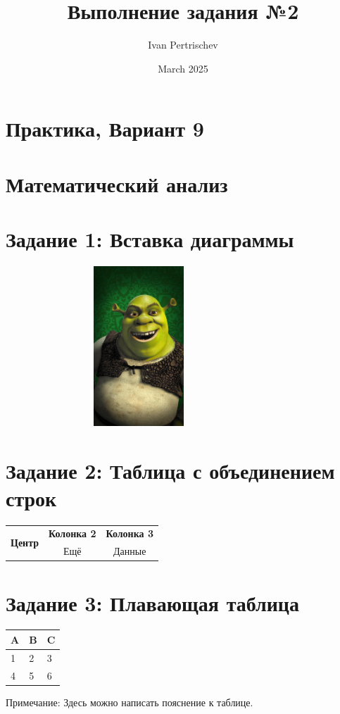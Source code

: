 \documentclass[a4paper, 11pt]{article}
\title{Выполнение задания №2}
\author{Ivan Pertrischev}
\date{March 2025}
\begin{document}
\maketitle

\section{Практика, Вариант 9}
\section{Математический анализ}

\section*{Задание 1: Вставка диаграммы}
\begin{center}
    \includegraphics[width=10cm,height=6cm,trim=0cm 2cm 0cm 0cm,clip,angle=12]{chart.jpg}
\end{center}

\section*{Задание 2: Таблица с объединением строк}
\begin{table}[h]
    \centering
    \begin{tabular}{ccc}
        \hline
        \multirow{2}{*}{\textbf{Центр}} & \textbf{Колонка 2} & \textbf{Колонка 3} \\
        \cline{2-3}
        & Ещё & Данные \\
        \hline
    \end{tabular}
\end{table}

\section*{Задание 3: Плавающая таблица}
\begin{table}[b]
    \centering
    \begin{tabularx}{0.7\textwidth}{XXX} 
        \toprule
        A & B & C \\
        \midrule
        1 & 2 & 3 \\
        4 & 5 & 6 \\
        \bottomrule
    \end{tabularx}
    
    \vspace{5pt} 
    \footnotesize Примечание: Здесь можно написать пояснение к таблице.
\end{table}
\end{document}
